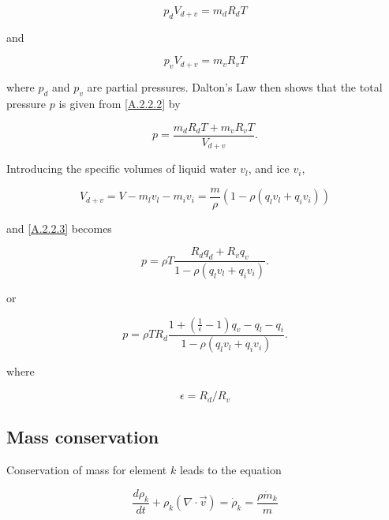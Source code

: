 \begin{equation}
\label{A.2.2.1}
p_{d}V_{d+v}=m_{d}R_{d}T
\end{equation}

and

\begin{equation}
\label{A.2.2.2}
p_{v}V_{d+v}=m_{v}R_{v}T
\end{equation}


where $ p_{d}$ and $ p_{v}$ are partial pressures. Dalton's Law then 
shows that the
total pressure $ p $ is given from \ref{A.2.2.2} by

\begin{equation}
\label{A.2.2.3}
p=\frac{m_{d}R_{d}T + m_{v}R_{v}T}{V_{d+v}}.
\end{equation}

Introducing the specific volumes of liquid water $ v_{l}$, and ice $ v_{i}$,

\begin{equation}
\label{A.2.2.4}V_{d+v}=V-m_{l}v_{l}-m_{i}v_{i}=\frac{m}{\rho}(1-\rho
(q_{l}v_{l}+q_{i}v_{i}))
\end{equation}

and \ref{A.2.2.3} becomes

\begin{equation}
\label{A.2.2.5}
p=\rho T \frac{R_{d}q_{d} + R_{v}q_{v}}{1-\rho
(q_{l}v_{l}+q_{i}v_{i})}.
\end{equation}


or

\begin{equation}
\label{A.2.2.6}
p=\rho T R_{d} \frac{1+\left(\frac{1}{\epsilon}-1\right)q_{v} - q_{l}-q_{i}}
{1-\rho (q_{l}v_{l}+q_{i}v_{i})}.
\end{equation}

where

\begin{equation}
\label{A.2.2.7}
\epsilon=R_{d}/R_{v}
\end{equation}

\subsection{Mass conservation}\label{suA.2.3}

  Conservation of mass for element $k$
leads to the equation

\begin{equation}
\label{A.2.3.1}
\frac{d\rho_{k}}{dt}+\rho_{k}(\nabla\cdot \vec{v})=\dot{\rho}_{k}=
\frac{\rho\dot{m}_{k}}{m}
\end{equation}

